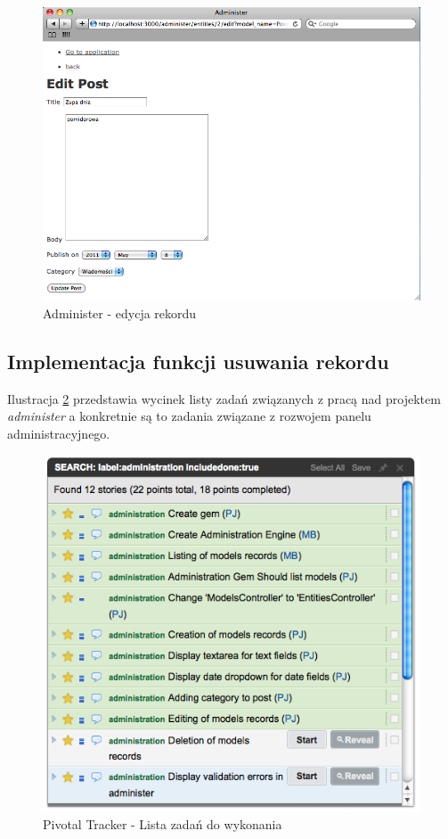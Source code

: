 	\begin{figure}[!h]
		\begin{center}
			\includegraphics[width=\linewidth]{images/administer_edit.png}
			\caption{Administer - edycja rekordu}
			\label{administer_edit}
		\end{center}
	\end{figure}
    
  \subsection{Implementacja funkcji usuwania rekordu}
    
    Ilustracja \ref{administer_stories}  przedstawia wycinek listy zadań związanych z pracą nad projektem \emph{administer} a konkretnie są to zadania związane z rozwojem panelu administracyjnego.
    
    \clearpage
    
    \begin{figure}
  		\begin{center}
  			\includegraphics[width=0.8\linewidth]{images/administer_stories_list.png}
  			\caption{Pivotal Tracker - Lista zadań do wykonania}
  			\label{administer_stories}
  		\end{center}
  	\end{figure}
  	
